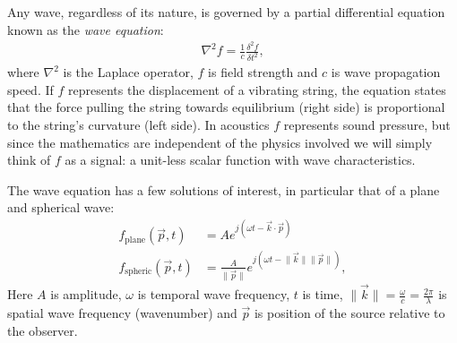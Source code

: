 {Any wave, regardless of its nature, is governed by a partial differential equation known as the \emph{wave equation}:
%
\begin{align}
\nabla^2 f 
 = \frac{1}{c}\frac{\delta^2 f}{\delta t^2},
\end{align}
%
where $\nabla^2$ is the Laplace operator, $f$ is field strength and $c$ is wave propagation speed. If $f$ represents the displacement of a vibrating string, the equation states that the force pulling the string towards equilibrium (right side) is proportional to the string's curvature (left side). In acoustics $f$ represents sound pressure, but since the mathematics are independent of the physics involved we will simply think of $f$ as a signal: a unit-less scalar function with wave characteristics.

The wave equation has a few solutions of interest, in particular that of a plane and spherical wave:
%
\begin{align}
f_\textrm{plane}(\vec{p},t)  &= A e^{j(\omega t - \vec{k} \cdot \vec{p})} \\
f_\textrm{spheric}(\vec{p},t) &= \frac{A}{\lVert \vec{p} \rVert} e^{j(\omega t - \lVert\vec{k}\rVert \lVert \vec{p} \rVert)},
\end{align}
% 
Here $A$ is amplitude, $\omega$ is temporal wave frequency, $t$ is time, $\lVert\vec{k}\rVert=\frac{\omega}{c}=\frac{2\pi}{\lambda}$ is spatial wave frequency (wavenumber) and $\vec{p}$ is position of the source relative to the observer. 

% 
% 
% 


%

%



}
